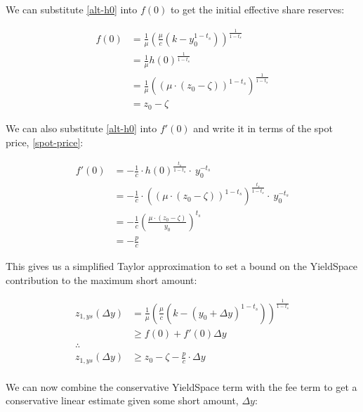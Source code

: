 We can substitute \eqref{alt-h0} into $f(0)$ to get the initial effective share reserves:

\begin{equation}
\begin{aligned}
    f(0) &= \frac{1}{\mu} \left( \frac{\mu}{c} \left( k - y_0^{1-t_s} \right) \right)^{\frac{1}{1 - t_s}} \\
    &= \frac{1}{\mu} h(0)^{\frac{1}{1 - t_s}} \\
    &= \frac{1}{\mu} \left( \left( \mu \cdot \left( z_0 - \zeta \right) \right)^{1 - t_s} \right)^{\frac{1}{1 - t_s}} \\
    &= z_0 - \zeta
\end{aligned}
\end{equation}

We can also substitute \eqref{alt-h0} into $f'(0)$ and write it in terms of the spot price, \eqref{spot-price}:

\begin{equation}
\begin{aligned}
    f'(0) &= - \frac{1}{c} \cdot h(0)^{\frac{t_s}{1 - t_s}} \cdot \ y_0^{-t_s} \\
    &= - \frac{1}{c} \cdot \left( \left( \mu \cdot \left( z_0 - \zeta \right) \right)^{1 - t_s} \right)^{\frac{t_s}{1 - t_s}} \cdot \ y_0^{-t_s} \\
    &= - \frac{1}{c} \left( \frac{\mu \cdot \left( z_0 - \zeta \right)}{y_0} \right)^{t_s} \\
    &= - \frac{p}{c}
\end{aligned}
\end{equation}

This gives us a simplified Taylor approximation to set a bound on the YieldSpace contribution to the maximum short amount:

\begin{equation}\label{approx-f-of-dy}
\begin{aligned}
    z_{1,ys}(\Delta y) &= \frac{1}{\mu} \left( \frac{\mu}{c} \left( k - \left( y_0 + \Delta y \right)^{1 - t_s} \right)\right)^{\frac{1}{1 - t_s}} \\
    &\ge f(0) + f'(0) \Delta y\\
    \therefore\\
    z_{1,ys}(\Delta y) &\ge z_0 - \zeta - \tfrac{p}{c} \cdot \Delta y \\
\end{aligned}
\end{equation}

We can now combine the conservative YieldSpace term with the fee term to get a conservative linear estimate given some short amount, $\Delta y$:

